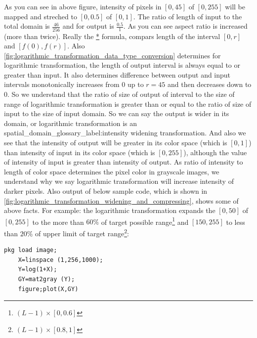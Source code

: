 \begin{enumerate}
    As you can see in above figure, intensity of pixels in $[0,45]$ of $[0,
    255]$ will be mapped and streched to $[0,0.5]$ of $[0,1]$. The ratio of
    length of input to the total domain is $\frac{46}{256}$ and for output is 
    $\frac{0.5}{1}$. As you can see aspect ratio is increased (more than twice).
    Really the \hyperref[relation:eq_1]{*} formula, compars length of the
    interval $[0,r]$ and $[f(0), f(r)]$. Also 
    \autoref{fig:logarithmic_transformation_data_type_conversion} determines for
    logarithmic transformation, the length of output interval is always equal to
    or greater than input. It also determines difference between output and
    input intervals monotonically increases from $0$ up to $r=45$ and then
    decreases down to $0$.  
So we understand that the ratio of size of output of interval to the size of
range of logarithmic transformation is greater than or equal to the ratio of 
size of input to the size of input domain. So we can say the output is wider in 
its domain, or logarithmic transformation is an 
\gls{spatial_domain_glossary_label:intensity widening} transformation. 
And also we see that the intensity of output will be greater in its
color space (which is $[0,1]$) than intensity of input in its color space (which
is $[0,255]$), although the value of intensity of input is greater than
intensity of output. As ratio of intensity to length of color space determines
the pixel color in grayscale images, we understand why we say logarithmic
transformation will increase intensity of darker pixels. 
Also output of below sample code, which is shown in 
\autoref{fig:logarithmic_transformation_widening_and_compressing}, shows 
some of above facts. For example: the logarithmic transformation expands 
the $[0,50]$ of $[0,255]$ to the more than $60\%$ of target possible 
range\footnote{$(L-1) \times [0, 0.6]$} and $[150,255]$ to less than 
$20\%$ of upper limit of target range\footnote{$(L-1) \times [0.8, 1]$}:
\begin{Verbatim}[frame=single,label=Octave lab:\ Logarithmic transformation ]
    pkg load image;
    X=linspace (1,256,1000);
    Y=log(1+X);
    GY=mat2gray (Y);
    figure;plot(X,GY)
\end{Verbatim}
\begin{figure}[htb!]

\end{figure}
\end{enumerate}
